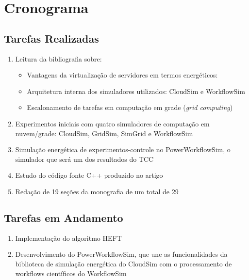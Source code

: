 \setcounter{chapter}{-1}
\chapter{Cronograma}
\label{cap:cronograma}

\section{Tarefas Realizadas}
	\label{sec:tarefas_realizadas}
	\begin{enumerate}
		\item Leitura da bibliografia sobre:
		\begin{itemize}
			\item Vantagens da virtualização de servidores em termos energéticos:
				\cite{barroso:case_energy_proportional}
				\cite{beloglazov:energy_efficient_allocation_virtual_machines}
				\cite{berl:energy_efficient_cloud_computing}
				\cite{feng:green500_encouraging_sustainable_supercomputing}
				\cite{murugesan:harnessing_green_it}
				\cite{vmware:virtualization_right_sizes_it}
				\cite{rivoire:models_metrics_enable_energy_efficient_optimizations}
			\item Arquitetura interna dos simuladores utilizados: CloudSim e WorkflowSim
				\cite{calheiros:cloudsim}
				\cite{chen:workflowsim}
			\item Escalonamento de tarefas em computação em grade (\emph{grid 
			computing})
				\cite{chaves:scheduling_software_requirements}
				\cite{batista:embedding_software_requirements}
		\end{itemize}
		\item Experimentos iniciais com quatro simuladores de computação em 
		nuvem/grade: CloudSim, GridSim, SimGrid e WorkflowSim
		\item Simulação energética de experimentos-controle no PowerWorkflowSim,
		o simulador que será um dos resultados do TCC
		\item Estudo do código fonte C++ produzido no artigo
			\cite{chaves:scheduling_software_requirements} 
		\item Redação de 19 seções da monografia de um total de 29
	\end{enumerate}

\section{Tarefas em Andamento}
\label{sec:tarefas_andamento}
	\begin{enumerate}
		\item Implementação do algoritmo HEFT
		\item Desenvolvimento do PowerWorkflowSim, que une as funcionalidades
		da biblioteca de simulação energética do CloudSim com o processamento de
		workflows científicos do WorkflowSim
	\end{enumerate}

